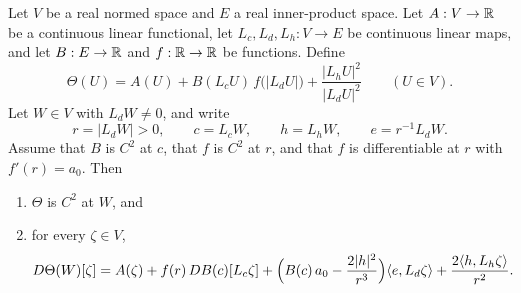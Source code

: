 \begin{lemma}
Let $V$ be a real normed space and $E$ a real inner-product space. Let
$A:V\to\mathbb{R}$ be a continuous linear functional, let $L_c,L_d,L_h:V\to E$ be
continuous linear maps, and let $B:E\to\mathbb{R}$ and $f:\mathbb{R}\to\mathbb{R}$ be functions. Define
\[
  \Theta(U)=A(U)+B(L_cU)\,f\bigl(|L_dU|\bigr)+\frac{|L_hU|^2}{|L_dU|^2}
  \qquad(U\in V).
\]
Let $W\in V$ with $L_dW\ne0$, and write
\[
  r=|L_dW|>0,\qquad c=L_cW,\qquad h=L_hW,\qquad e=r^{-1}L_dW .
\]
Assume that $B$ is $C^2$ at $c$, that $f$ is $C^2$ at $r$, and that $f$ is
differentiable at $r$ with $f'(r)=a_0$. Then
\begin{enumerate}
\item $\Theta$ is $C^2$ at $W$, and
\item for every $\zeta\in V$,
\[
  D\Theta(W)[\zeta]
   =A(\zeta)+f(r)\,DB(c)[L_c\zeta]
     +\Bigl(B(c)\,a_0-\frac{2|h|^2}{r^3}\Bigr)\langle e,L_d\zeta\rangle
     +\frac{2\langle h,L_h\zeta\rangle}{r^2}.
\]
\end{enumerate}
\end{lemma}
